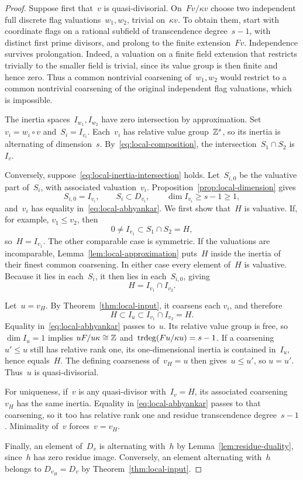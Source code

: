 \begin{proof}
Suppose first that~\(v\) is quasi-divisorial.  On~\(Fv/\kappa v\)
choose two independent full discrete flag valuations~\(w_1,w_2\),
trivial on~\(\kappa v\).  To obtain them, start with coordinate flags
on a rational subfield of transcendence degree~\(s-1\), with distinct
first prime divisors, and prolong to the finite extension~\(Fv\).
Independence survives prolongation.  Indeed, a valuation on a finite
field extension that restricts trivially to the smaller field is
trivial, since its value group is then finite and hence zero.  Thus a
common nontrivial coarsening of~\(w_1,w_2\) would restrict to a common
nontrivial coarsening of the original independent flag valuations,
which is impossible.

The inertia spaces~\(I_{w_1},I_{w_2}\) have zero intersection by
approximation.  Set~\(v_i=w_i\circ v\) and~\(S_i=I_{v_i}\).
Each~\(v_i\) has relative value group~\(\mathbb Z^s\), so its inertia is
alternating of dimension~\(s\).  By~\eqref{eq:local-composition}, the
intersection~\(S_1\cap S_2\) is~\(I_v\).

Conversely, suppose~\eqref{eq:local-inertia-intersection} holds.
Let~\(S_{i,0}\) be the valuative part of~\(S_i\), with associated
valuation~\(v_i\).  Proposition~\ref{prop:local-dimension} gives
\[
 S_{i,0}=I_{v_i},\qquad S_i\subset D_{v_i},
 \qquad \dim I_{v_i}\geq s-1\geq1,
\]
and~\(v_i\) has equality in~\eqref{eq:local-abhyankar}.
We first show that~\(H\) is valuative.  If, for example,
\(v_1\leq v_2\), then
\[
 0\ne I_{v_1}\subset S_1\cap S_2=H,
\]
so~\(H=I_{v_1}\).  The other comparable case is symmetric.  If the
valuations are incomparable, Lemma~\ref{lem:local-approximation}
puts~\(H\) inside the inertia of their finest common coarsening.
In either case every element of~\(H\) is valuative.  Because it lies
in each~\(S_i\), it then lies in each~\(S_{i,0}\), giving
\[
 H=I_{v_1}\cap I_{v_2}.
\]

Let~\(u=v_H\).  By Theorem~\ref{thm:local-input}, it coarsens each
\(v_i\), and therefore
\[
 H\subset I_u\subset I_{v_1}\cap I_{v_2}=H.
\]
Equality in~\eqref{eq:local-abhyankar} passes to~\(u\).
Its relative value group is free, so~\(\dim I_u=1\) implies
\(uF/u\kappa\cong\mathbb Z\) and~\(\operatorname{trdeg}(Fu/\kappa u)=s-1\).
If a coarsening~\(u'\leq u\) still has relative rank one, its
one-dimensional inertia is contained in~\(I_u\), hence equals~\(H\).
The defining coarseness of~\(v_H=u\) then gives~\(u\leq u'\), so
\(u=u'\).  Thus~\(u\) is quasi-divisorial.

For uniqueness, if~\(v\) is any quasi-divisor with~\(I_v=H\), its
associated coarsening~\(v_H\) has the same inertia.  Equality in
\eqref{eq:local-abhyankar} passes to that coarsening, so it too has
relative rank one and residue transcendence degree~\(s-1\).
Minimality of~\(v\) forces~\(v=v_H\).

Finally, an element of~\(D_v\) is alternating with~\(h\) by
Lemma~\ref{lem:residue-duality}, since~\(h\) has zero residue image.
Conversely, an element alternating with~\(h\) belongs to
\(D_{v_H}=D_v\) by Theorem~\ref{thm:local-input}.
\end{proof}

